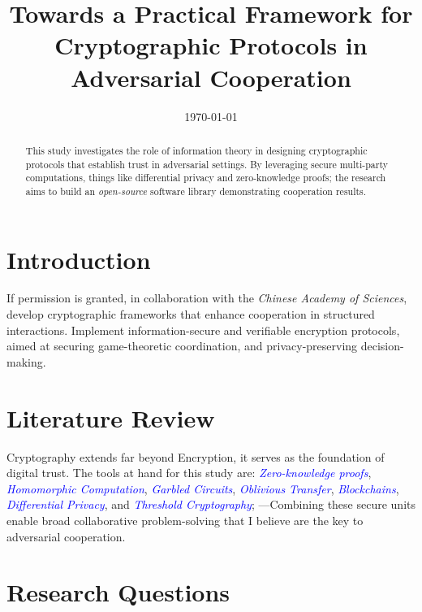 \documentclass[conference]{IEEEtran}
\date{\today}
\begin{document}
\title{Towards a Practical Framework for Cryptographic Protocols in Adversarial Cooperation}
\author{
}

\maketitle

\begin{abstract}
This study investigates the role of information theory in designing cryptographic protocols that establish trust in adversarial settings. 
By leveraging secure multi-party computations, things like differential privacy and zero-knowledge proofs; the research aims to build 
an \textit{open-source} software library demonstrating cooperation results.
\end{abstract}

\section{Introduction}
If permission is granted, in collaboration with the \textit{Chinese Academy of Sciences}, 
develop cryptographic frameworks that enhance cooperation in structured interactions. 
Implement information-secure and verifiable encryption protocols, aimed at securing game-theoretic coordination, and privacy-preserving decision-making.


\section{Literature Review}
Cryptography extends far beyond Encryption, it serves as the foundation of digital trust. The tools at hand for this study are: 
\textcolor{blue}{\textit{Zero-knowledge proofs}}, 
\textcolor{blue}{\textit{Homomorphic Computation}}, 
\textcolor{blue}{\textit{Garbled Circuits}}, 
\textcolor{blue}{\textit{Oblivious Transfer}}, 
\textcolor{blue}{\textit{Blockchains}}, 
\textcolor{blue}{\textit{Differential Privacy}}, and 
\textcolor{blue}{\textit{Threshold Cryptography}}; 
---Combining these secure units enable broad collaborative problem-solving that I believe are the key to adversarial cooperation.

\vspace{5pt}
\section{Research Questions}
\end{document}
